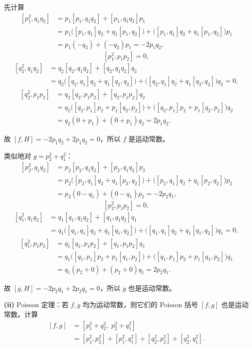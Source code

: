 \begin{question}
\begin{solution}
先计算
\[
\begin{aligned}
[p_1^2, q_1q_2] &= p_1[p_1,q_1q_2] + [p_1,q_1q_2]p_1 \\
&= p_1\bigl([p_1,q_1]q_2+q_1[p_1,q_2]\bigr)
+\bigl([p_1,q_1]q_2+q_1[p_1,q_2]\bigr)p_1 \\
&= p_1(-q_2)+(-q_2)p_1 = -2p_1q_2,
\end{aligned}
\]
\[
[p_1^2,p_1p_2]=0,
\]
\[
\begin{aligned}
[q_2^2,q_1q_2] &= q_2[q_2,q_1q_2] + [q_2,q_1q_2]q_2 \\
&= q_2\bigl([q_2,q_1]q_2+q_1[q_2,q_2]\bigr)
+\bigl([q_2,q_1]q_2+q_1[q_2,q_2]\bigr)q_2 = 0,
\end{aligned}
\]
\[
\begin{aligned}
[q_2^2,p_1p_2] &= q_2[q_2,p_1p_2] + [q_2,p_1p_2]q_2 \\
&= q_2\bigl([q_2,p_1]p_2+p_1[q_2,p_2]\bigr)
+\bigl([q_2,p_1]p_2+p_1[q_2,p_2]\bigr)q_2 \\
&= q_2(0+p_1)+(0+p_1)q_2 = 2p_1q_2.
\end{aligned}
\]

故 \([f,H]=-2p_1q_2+2p_1q_2=0\)，所以 \(f\) 是运动常数。

类似地对 \(g=p_2^2+q_1^2\)：
\[
\begin{aligned}
[p_2^2,q_1q_2] &= p_2[p_2,q_1q_2]+[p_2,q_1q_2]p_2 \\
&= p_2\bigl([p_2,q_1]q_2+q_1[p_2,q_2]\bigr)
+\bigl([p_2,q_1]q_2+q_1[p_2,q_2]\bigr)p_2 \\
&= p_2(0 - q_1)+(0 - q_1)p_2 = -2p_2q_1,
\end{aligned}
\]
\[
[p_2^2,p_1p_2]=0,
\]
\[
\begin{aligned}
[q_1^2,q_1q_2] &= q_1[q_1,q_1q_2]+[q_1,q_1q_2]q_1 \\
&= q_1\bigl([q_1,q_1]q_2+q_1[q_1,q_2]\bigr)
+\bigl([q_1,q_1]q_2+q_1[q_1,q_2]\bigr)q_1 = 0,
\end{aligned}
\]
\[
\begin{aligned}
[q_1^2,p_1p_2] &= q_1[q_1,p_1p_2]+[q_1,p_1p_2]q_1 \\
&= q_1\bigl([q_1,p_1]p_2+p_1[q_1,p_2]\bigr)
+\bigl([q_1,p_1]p_2+p_1[q_1,p_2]\bigr)q_1 \\
&= q_1(p_2+0)+(p_2+0)q_1 = 2p_2q_1.
\end{aligned}
\]

故 \([g,H]=-2p_2q_1+2p_2q_1=0\)，所以 \(g\) 也是运动常数。

\vspace{0.5em}
\textbf{(ii)} Poisson 定理：若 \(f,g\) 均为运动常数，则它们的 Poisson 括号 \([f,g]\) 也是运动常数。计算
\[
\begin{aligned}
[f,g] &= [p_1^2+q_2^2,\;p_2^2+q_1^2] \\
&= [p_1^2,p_2^2] + [p_1^2,q_1^2] + [q_2^2,p_2^2] + [q_2^2,q_1^2].
\end{aligned}
\]


\end{solution}
\end{question}
